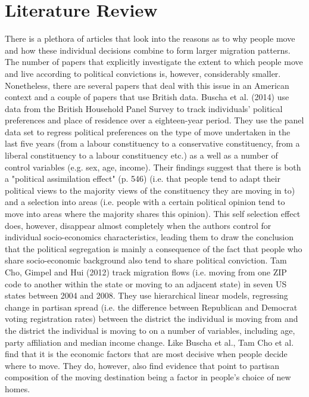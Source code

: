 \documentclass[12pt, a4paper]{article}
\begin{document}
	\section{Literature Review}\label{lit}
	There is a plethora of articles that look into the reasons as to why people move and how these individual decisions combine to form larger migration patterns. The number of papers that explicitly investigate the extent to which people move and live according to political convictions is, however, considerably smaller. Nonetheless, there are several papers that deal with this issue in an American context and a couple of papers that use British data. 
	\newline Buscha et al. (2014) use data from the British Household Panel Survey to track individuals' political preferences and place of residence over a eighteen-year period. They use the panel data set to regress political preferences on the type of move undertaken in the last five years (from a labour constituency to a conservative constituency, from a liberal constituency to a labour constituency etc.) as a well as a number of control variables (e.g. sex, age, income). Their findings suggest that there is both a "political assimilation effect" (p. 546) (i.e. that people tend to adapt their political views to the majority views of the constituency they are moving in to) and a selection into areas (i.e. people with a certain political opinion tend to move into areas where the majority shares this opinion). This self selection effect does, however, disappear almost completely when the authors control for individual socio-economics characteristics, leading them to draw the conclusion that the political segregation is mainly a consequence of the fact that people who share socio-economic background also tend to share  political conviction.   
	\newline Tam Cho, Gimpel and Hui (2012) track migration flows (i.e. moving from one ZIP code to another within the state or moving to an adjacent state) in seven US states between 2004 and 2008. They use hierarchical linear models, regressing change in partisan spread (i.e. the difference between Republican and Democrat voting registration rates) between the district the individual is moving from and the district the individual is moving to on a number of variables, including age, party affiliation and median income change. Like Buscha et al., Tam Cho et al. find that it is the economic factors that are most decisive when people decide where to move. They do, however, also find evidence that point to partisan composition of the moving destination being a factor in people's choice of new homes. 
\end{document}
